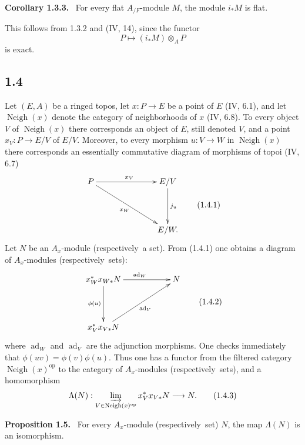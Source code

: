\documentclass[11pt]{article}
\newcommand{\Vois}{\operatorname{Neigh}}
\newcommand{\ad}{\operatorname{ad}}
\newcommand{\resp}{respectively}
\newcommand{\op}{\mathrm{op}}
\newenvironment{statement}[1]{\par\medskip\noindent\textbf{#1.}\ }{\par\medskip}
\begin{document}
\begin{statement}{Corollary 1.3.3}
For every flat $A_{/F}$-module $M$, the module $i_*M$ is flat.
\end{statement}

This follows from 1.3.2 and (IV, 14), since the functor
\[
P\longmapsto (i_*M)\otimes_A P
\]
is exact.

\subsection*{1.4}

Let $(E,A)$ be a ringed topos, let $x:P\to E$ be a point of $E$ (IV, 6.1), and let $\Vois(x)$ denote the category of neighborhoods of $x$ (IV, 6.8). To every object $V$ of $\Vois(x)$ there corresponds an object of $E$, still denoted $V$, and a point $x_V:P\to E/V$ of $E/V$. Moreover, to every morphism $u:V\to W$ in $\Vois(x)$ there corresponds an essentially commutative diagram of morphisms of topoi (IV, 6.7)
\[
\vcenter{\xymatrix@C=2.5cm@R=1.5cm{
P \ar[r]^{x_V}\ar[rd]_{x_W} & E/V \ar[d]^{j_u}\\
& E/W .
}}
\tag{1.4.1}
\]
Let $N$ be an $A_x$-module (\resp\ a set). From (1.4.1) one obtains a diagram of $A_x$-modules (\resp\ sets):
\[
\vcenter{\xymatrix@C=2cm@R=1.5cm{
x_W^*x_{W*}N \ar[r]^{\ad_W}\ar[d]_{\phi(u)} & N\\
x_V^*x_{V*}N \ar[ru]_{\ad_V}&
}}
\tag{1.4.2}
\]
where $\ad_W$ and $\ad_V$ are the adjunction morphisms. One checks immediately that $\phi(uv)=\phi(v)\phi(u)$. Thus one has a functor from the filtered category $\Vois(x)^\op$ to the category of $A_x$-modules (\resp\ sets), and a homomorphism
\[
\Lambda(N):\varinjlim_{V\in \Vois(x)^\op}x_V^*x_{V*}N\longrightarrow N .
\tag{1.4.3}
\]

\begin{statement}{Proposition 1.5}
For every $A_x$-module (\resp\ set) $N$, the map $\Lambda(N)$ is an isomorphism.
\end{statement}
\end{document}
